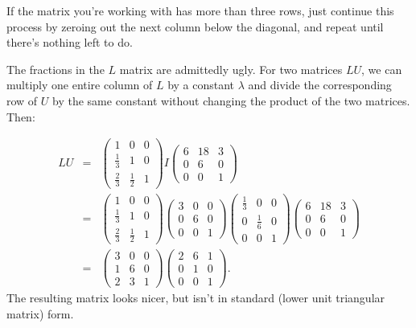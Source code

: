 If the matrix you're working with has more than three rows, just continue this process by zeroing out the next column below the diagonal, and repeat until there's nothing left to do.


The fractions in the $L$ matrix are admittedly ugly.  For two matrices $LU$, we can multiply one entire column of $L$ by a constant $\lambda$ and divide the corresponding row of $U$ by the same constant without changing the product of the two matrices.  Then:

\begin{eqnarray*}
LU &=& \begin{pmatrix}
1 & 0 & 0 \\[1mm]
\frac{1}{3} & 1 & 0 \\[1mm]
\frac{2}{3} & \frac{1}{2} & 1 
\end{pmatrix}
I
\begin{pmatrix}
6 & 18 & 3 \\
0 & 6 & 0 \\
0 & 0 & 1 
\end{pmatrix} \\
&=&
\begin{pmatrix}
1 & 0 & 0 \\[1mm]
\frac{1}{3} & 1 & 0 \\[1mm]
\frac{2}{3} & \frac{1}{2} & 1 
\end{pmatrix}
\begin{pmatrix}
3 & 0 & 0 \\
0 & 6 & 0 \\
0 & 0 & 1 
\end{pmatrix}
\begin{pmatrix}
\frac{1}{3} & 0 & 0 \\[1mm]
0 & \frac{1}{6} & 0 \\[1mm]
0 & 0 & 1 
\end{pmatrix}
\begin{pmatrix}
6 & 18 & 3 \\
0 & 6 & 0 \\
0 & 0 & 1 
\end{pmatrix} \\
&=&
\begin{pmatrix}
3 & 0 & 0 \\
1 & 6 & 0 \\
2 & 3 & 1 
\end{pmatrix}\begin{pmatrix}
2 & 6 & 1 \\
0 & 1 & 0 \\
0 & 0 & 1 
\end{pmatrix}.
\end{eqnarray*}
The resulting matrix looks nicer, but isn't in standard (lower unit triangular matrix) form.

